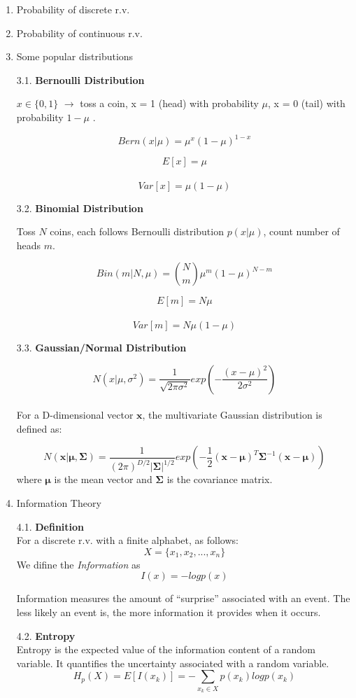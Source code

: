 \documentclass[
]{ctexart}
\begin{document}
\begin{enumerate}
\def\labelenumi{\arabic{enumi}.}
\item
  Probability of discrete r.v.
\item
  Probability of continuous r.v.
\item
  Some popular distributions

  3.1. \textbf{Bernoulli Distribution}

  \(x \in \{0,1\}\) \(\rightarrow\) toss a coin, x = 1 (head) with
  probability \(\mu\), x = 0 (tail) with probability \(1-\mu\) .

  \[Bern(x|\mu) = \mu^x(1-\mu)^{1-x}\]

  \[E[x] = \mu\]\\
  \[Var[x] = \mu(1-\mu)\]

  3.2. \textbf{Binomial Distribution}

  Toss \(N\) coins, each follows Bernoulli distribution \(p(x|\mu)\),
  count number of heads \(m\).

  \[Bin(m|N,\mu) = \binom{N}{m} \mu^m(1-\mu)^{N-m}\]

  \[E[m] = N\mu\]\\
  \[Var[m] = N\mu(1-\mu)\]

  3.3. \textbf{Gaussian/Normal Distribution}

  \[N(x|\mu,\sigma^2) = \frac{1}{\sqrt{2\pi\sigma^2}}exp(-\frac{(x-\mu)^2}{2\sigma^2})\]\\
  For a D-dimensional vector \(\mathbf{x}\), the multivariate Gaussian
  distribution is defined as:

  \[N(\mathbf{x}|\boldsymbol{\mu},\boldsymbol{\Sigma}) = \frac{1}{(2\pi)^{D/2}|\boldsymbol{\Sigma}|^{1/2}}exp(-\frac{1}{2}(\mathbf{x}-\boldsymbol{\mu})^T\boldsymbol{\Sigma}^{-1}(\mathbf{x}-\boldsymbol{\mu}))\]
  where \(\boldsymbol{\mu}\) is the mean vector and
  \(\boldsymbol{\Sigma}\) is the covariance matrix.
\item
  Information Theory

  4.1. \textbf{Definition}\\
  For a discrete r.v. with a finite alphabet, as follows:
  \[X = \{x_1, x_2, ..., x_n\}\] We difine the \emph{Information} as
  \[I(x) = -log p(x)\]

  Information measures the amount of ``surprise'' associated with an
  event. The less likely an event is, the more information it provides
  when it occurs.

  4.2. \textbf{Entropy}\\
  Entropy is the expected value of the information content of a random
  variable. It quantifies the uncertainty associated with a random
  variable. \[H_p(X) = E[I(x_k)] = -\sum_{x_k \in X} p(x_k) log p(x_k)\]


\end{enumerate}
\end{document}
